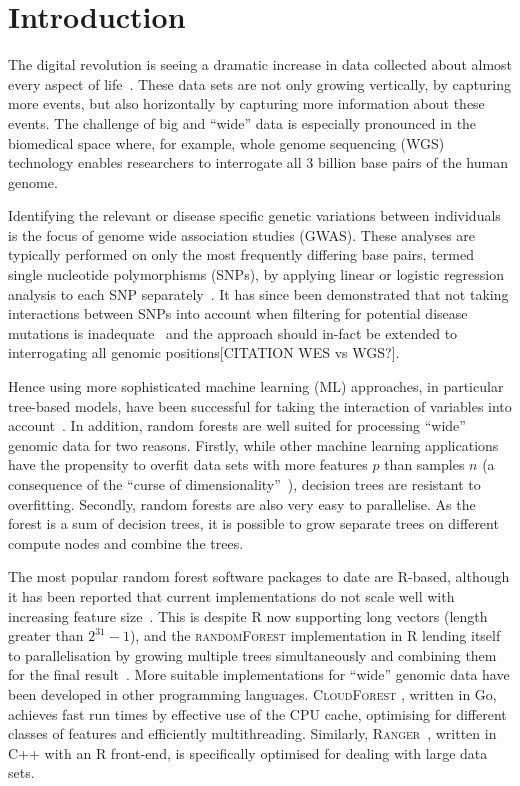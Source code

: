 \documentclass[10pt,letterpaper]{article}
\newcommand{\ranger}{\textsc{Ranger}\xspace}
\newcommand{\randomforest}{\textsc{randomForest}\xspace}
\begin{document}
\linenumbers

\section{Introduction}
The digital revolution is seeing a dramatic increase in data collected about almost every aspect of
life~\cite{Loebbecke2015}.  These data sets are not only growing vertically, by capturing more events, but also
horizontally by capturing more information about these events.  The challenge of big and ``wide'' data is especially
pronounced in the biomedical space where, for example, whole genome sequencing (WGS) technology enables researchers to
interrogate all 3 billion base pairs of the human genome.

Identifying the relevant or disease specific genetic variations between individuals is the focus of genome wide
association studies (GWAS).  These analyses are typically performed on only the most frequently differing base pairs,
termed single nucleotide polymorphisms (SNPs), by applying linear or logistic regression analysis to each SNP
separately~\cite{CCC2007}.  It has since been demonstrated that not taking interactions between SNPs into account
when filtering for potential disease mutations is inadequate~\cite{Manolio2009,Yang2011} and the approach should 
in-fact be extended to interrogating all genomic positions[CITATION WES vs WGS?].

Hence using more sophisticated machine learning (ML) approaches, in particular tree-based models, have been successful
for taking the interaction of variables into account~\cite{Wright.et.al.2016}. In addition, random forests \cite{Breiman2001} are well
suited for processing ``wide'' genomic data for two reasons.  Firstly, while other machine learning applications have
the propensity to overfit data sets with more features $p$ than samples $n$ (a consequence of the ``curse of
dimensionality''~\cite{Bauer2014, bellman1961adaptive}), decision trees are resistant to overfitting.  Secondly, random
forests are also very easy to parallelise. As the forest is a sum of decision trees, it is possible to grow separate
trees on different compute nodes and combine the trees. 

The most popular random forest software packages to date are R-based, although it has been reported that current implementations 
do not scale well with increasing feature size~\cite{Wright.and.Ziegle.2016}.  This is despite R now supporting long vectors (length greater
than $2^{31}-1$), and the \randomforest implementation in R lending itself to parallelisation by growing multiple
trees simultaneously and combining them for the final result~\cite{Liaw.and.Weiner.2002}.  More suitable implementations for ``wide''
genomic data have been developed in other programming languages. \textsc{CloudForest} \cite{Bressler2015}, written in Go,
achieves fast run times by effective use of the CPU cache, optimising for different classes of features and efficiently
multithreading.  Similarly, \ranger~\cite{Wright.and.Ziegle.2016}, written in C++ with an R front-end, is
specifically optimised for dealing with large data sets.
\end{document}
